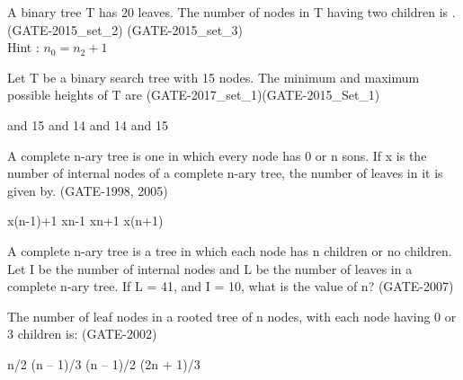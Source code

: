 \begin{questyle}
  \question  A binary tree T has 20 leaves. The number of nodes in T having two children is \fillin[19]. (GATE-2015\_set\_2)
            (GATE-2015\_set\_3) \\ Hint :  \( n_0 =  n_2 + 1 \)
\end{questyle}

\begin{questyle}
  \question  Let T be a binary search tree with 15 nodes. The minimum and maximum possible heights of T are
             (GATE-2017\_set\_1)(GATE-2015\_Set\_1)

  \begin{oneparchoices}
     and 15
     and 14
     and 14
     and 15
  \end{oneparchoices}
\end{questyle}


\begin{questyle}
  \question  A complete n-ary tree is one in which every node has 0 or n sons. If x is the
             number of internal nodes of a complete n-ary tree, the number of leaves in it is given by.  (GATE-1998, 2005)

  \begin{oneparchoices}
    \CorrectChoice  x(n-1)+1
    \choice         xn-1
    \choice         xn+1
    \choice         x(n+1)
  \end{oneparchoices}
\end{questyle}

\begin{questyle}
  \question  A complete n-ary tree is a tree in which each node has n children or no children.
            Let I be the number of internal nodes and L be the number of leaves in a complete
            n-ary tree. If L = 41, and I = 10, what is the value of n? (GATE-2007)

  \begin{oneparchoices}
  \end{oneparchoices}
\end{questyle}



\begin{questyle}
  \question  The number of leaf nodes in a rooted tree of n nodes, with each node having 0 or 3 children is:  (GATE-2002)

  \begin{oneparchoices}
    \choice         n/2
    \choice         (n – 1)/3
    \choice         (n – 1)/2
    \CorrectChoice  (2n + 1)/3
  \end{oneparchoices}
\end{questyle}


